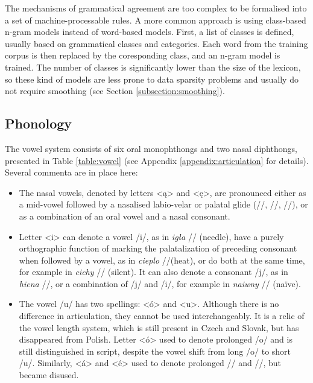 The mechanisms of grammatical agreement are too complex to be formalised into a set of machine-processable rules. A more common approach is using class-based n-gram models instead of word-based models. First, a list of classes is defined, usually based on grammatical classes and categories. Each word from the training corpus is then replaced by the coresponding class, and an n-gram model is trained. The number of classes is significantly lower than the size of the lexicon, so these kind of models are less prone to data sparsity problems and usually do not require smoothing (see Section \ref{subsection:smoothing}).

\subsection{Phonology}
The vowel system consists of six oral monophthongs and two nasal diphthongs, presented in Table \ref{table:vowel} (see Appendix \ref{appendix:articulation} for details). Several commenta are in place here:
\begin{itemize}
\item The nasal vowels, denoted by letters <ą> and <ę>, are pronounced either as a mid-vowel followed by a nasalised labio-velar or palatal glide (//, //, //), or as a combination of an oral vowel and a nasal consonant.
\item Letter <i> can denote a vowel /i/, as in \textit{igła} // (needle), have a purely orthographic function of marking the palatalization of preceding consonant when followed by a vowel, as in \textit{cieplo} //(heat), or do both at the same time, for example in \textit{cichy} // (silent). It can also denote a consonant /j/, as in \textit{hiena} //, or a combination of /j/ and /i/, for example in \textit{naiwny} // (naïve).
\item The vowel /u/ has two spellings: <ó> and <u>. Although there is no difference in articulation, they cannot be used interchangeably. It is a relic of the vowel length system, which is still present in Czech and Slovak, but has disappeared from Polish. Letter <ó> used to denote prolonged /o/ and is still distinguished in script, despite the vowel shift from long /o/ to short /u/. Similarly, <á> and <é> used to denote prolonged // and //, but became disused.
\end{itemize}

